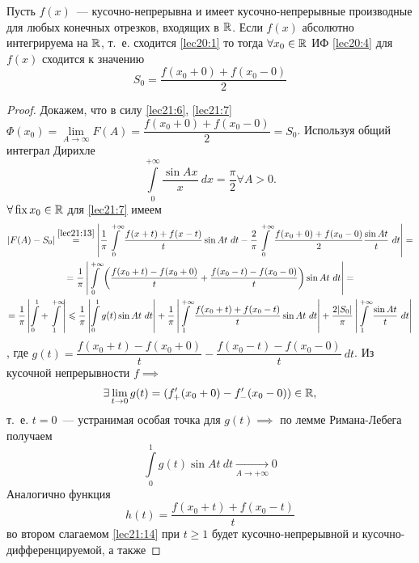 \documentclass[../../main.tex]{subfiles}
\begin{document}
\begin{thm}[о сходимости ИФ]
	Пусть $ f(x) $~--- кусочно-непрерывна и имеет кусочно-непрерывные
	производные для любых конечных отрезков, входящих в $ \mathbb{R} $.
	Если $ f(x) $ абсолютно интегрируема на $ \mathbb{R} $, т.~е.
	сходится \eqref{lec20:1} то тогда 
	$ \forall x_0 \in \mathbb{R} $ ИФ \eqref{lec20:4} для $ f(x) $ сходится
	к значению 
	\begin{equation}
	\label{lec21:13}
	S_0 = \dfrac{f(x_0 + 0) + f(x_0 - 0)}{2}
	\end{equation}
\end{thm}
\begin{proof}
	Докажем, что в силу \eqref{lec21:6}, \eqref{lec21:7}
	$ \Phi(x_0) = \lim\limits_{A \to \infty} F(A) = 
	\dfrac{f(x_0 + 0) + f(x_0 - 0)}{2} = S_0 $.
	Используя общий интеграл Дирихле 
	\[
	\int\limits_{0}^{+\infty} \dfrac{\sin Ax}{x}\ dx = 
	\dfrac{\pi}{2} \forall A > 0.
	\]
	$ \forall \operatorname{fix} x_0 \in \mathbb{R} $ для \eqref{lec21:7} имеем
	\begin{equation}
	\label{lec21:14}
	\begin{gathered}
	|F(A) - S_0| \stackrel{\eqref{lec21:13}}{=}
	\left|
	\dfrac{1}{\pi}
	\int\limits_{0}^{+\infty}
	\dfrac{f(x + t) + f(x - t)}{t} \sin At\ dt - 
	\dfrac{2}{\pi} \int\limits_{0}^{+\infty} 
	\dfrac{f(x_0 + 0) + f(x_0 - 0)}{2} \dfrac{\sin At}{t}\ dt
	\right| = \\ =
	\dfrac{1}{\pi} \left|
	\int\limits_{0}^{+\infty} \left(
	\dfrac{f(x_0 + t) - f(x_0 + 0)}{t} +
	\dfrac{f(x_0 - t) - f(x_0 - 0) }{t}
	\right)
	\sin At\ dt
	\right| = \\ = \dfrac{1}{\pi}
	\left|
	\int\limits_{0}^{1} + \int\limits_{1}^{+\infty}
	\right| \leqslant \dfrac{1}{\pi}
	\left|
	\int\limits_{0}^{1} g(t) \sin At\ dt
	\right| + \dfrac{1}{\pi}
	\left|
	\int\limits_{1}^{+\infty} 
	\dfrac{f(x_0 + t) + f(x_0 - t)}{t} \sin At\ dt
	\right| + \dfrac{2|S_0|}{\pi}
	\left|
	\int\limits_{1}^{+\infty} \dfrac{\sin At}{t}\ dt
	\right|
	\end{gathered}
	\end{equation}, где $ g(t) = \dfrac{f(x_0 + t) - f(x_0 + 0)}{t} - 
	\dfrac{f(x_0 - t) - f(x_0 - 0)}{t}\ dt $.
	Из кусочной непрерывности $ f \implies $
	\[
	\exists \lim\limits_{t \to 0} g(t) =
	(f_+'(x_0 + 0) - f_-'(x_0 - 0)) \in \mathbb{R},
	\] т.~е. $ t = 0 $~--- устранимая особая точка для $ g(t) \implies $
	по лемме Римана-Лебега получаем
	\[
	\int\limits_{0}^{1} g(t) \sin At\ dt
	\underset{A \to +\infty}{\to} 0
	\]
	Аналогично функция \[
	h(t) = \dfrac{f(x_0 + t) + f(x_0 - t)}{t}
	\] во втором слагаемом \eqref{lec21:14} при 
	$ t \geq 1 $ будет кусочно-непрерывной и кусочно-дифференцируемой, а также

\end{proof}
\end{document}
